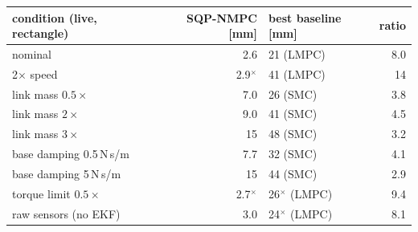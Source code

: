 \begin{tabular}{lrlr}
\toprule
condition (live, rectangle) & SQP-NMPC [mm] & best baseline [mm] & ratio \\
\midrule
nominal & 2.6 & 21 (LMPC) & 8.0 \\
2$\times$ speed & 2.9$^\times$ & 41 (LMPC) & 14 \\
link mass $0.5\times$ & 7.0 & 26 (SMC) & 3.8 \\
link mass $2\times$ & 9.0 & 41 (SMC) & 4.5 \\
link mass $3\times$ & 15 & 48 (SMC) & 3.2 \\
base damping 0.5\,N\,s/m & 7.7 & 32 (SMC) & 4.1 \\
base damping 5\,N\,s/m & 15 & 44 (SMC) & 2.9 \\
torque limit $0.5\times$ & 2.7$^\times$ & 26$^\times$ (LMPC) & 9.4 \\
raw sensors (no EKF) & 3.0 & 24$^\times$ (LMPC) & 8.1 \\
\bottomrule
\end{tabular}
